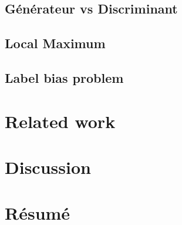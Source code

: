 \documentclass[a4paper]{article}
\begin{document}
\subsection{Générateur vs Discriminant}

\subsection{Local Maximum}

\subsection{Label bias problem}

\section{Related work}
\section{Discussion}
\section{Résumé}
\cite{greenwade93}




\end{document}
